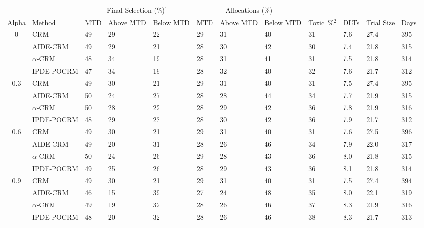\begin{tabular*}{\textwidth}{@{\extracolsep\fill}clllllllllll@{\extracolsep\fill}}
\toprule
&  & \multicolumn{3}{c}{Final Selection (\%)$^1$} & \multicolumn{3}{c}{Allocations (\%)} & &  &  &  \\
\multirow{2}{2em}{Alpha} & \multirow{2}{2em}{Method} & \multirow{2}{2em}{MTD} & \multirow{2}{2em}{Above MTD} & \multirow{2}{2em}{Below MTD} & \multirow{2}{2em}{MTD} & \multirow{2}{2em}{Above MTD} & \multirow{2}{2em}{Below MTD} & \multirow{2}{2em}{Toxic~\%$^2$} & \multirow{2}{2em}{DLTs} & \multirow{2}{2em}{Trial Size} & \multirow{2}{2em}{Days}  \\ \\ 
\midrule
\multirow{4}{2em}{0} & CRM & 49 & 29 & 22 & 29 & 31 & 40 & 31 & 7.6 & 27.4 & 395\\
 & AIDE-CRM & 49 & 29 & 21 & 28 & 30 & 42 & 30 & 7.4 & 21.8 & 315\\
 & $\alpha$-CRM & 48 & 34 & 19 & 28 & 31 & 41 & 31 & 7.5 & 21.8 & 314\\
 & IPDE-POCRM & 47 & 34 & 19 & 28 & 32 & 40 & 32 & 7.6 & 21.7 & 312\\
\midrule
\multirow{4}{2em}{0.3} & CRM & 49 & 30 & 21 & 29 & 31 & 40 & 31 & 7.5 & 27.4 & 395\\
 & AIDE-CRM & 50 & 24 & 27 & 28 & 28 & 44 & 34 & 7.7 & 21.9 & 315\\
 & $\alpha$-CRM & 50 & 28 & 22 & 28 & 29 & 42 & 36 & 7.8 & 21.9 & 316\\
 & IPDE-POCRM & 48 & 29 & 23 & 28 & 30 & 42 & 36 & 7.9 & 21.7 & 312\\
\midrule
\multirow{4}{2em}{0.6} & CRM & 49 & 30 & 21 & 29 & 31 & 40 & 31 & 7.6 & 27.5 & 396\\
 & AIDE-CRM & 49 & 20 & 31 & 28 & 26 & 46 & 34 & 7.9 & 22.0 & 317\\
 & $\alpha$-CRM & 50 & 24 & 26 & 29 & 28 & 43 & 36 & 8.0 & 21.8 & 315\\
 & IPDE-POCRM & 49 & 25 & 26 & 28 & 29 & 43 & 36 & 8.1 & 21.8 & 314\\
\midrule
\multirow{4}{2em}{0.9} & CRM & 49 & 30 & 21 & 29 & 31 & 40 & 31 & 7.5 & 27.4 & 394\\
 & AIDE-CRM & 46 & 15 & 39 & 27 & 24 & 48 & 35 & 8.0 & 22.1 & 319\\
 & $\alpha$-CRM & 49 & 19 & 32 & 28 & 26 & 46 & 37 & 8.3 & 21.9 & 316\\
 & IPDE-POCRM & 48 & 20 & 32 & 28 & 26 & 46 & 38 & 8.3 & 21.7 & 313\\
\bottomrule
\end{tabular*}
